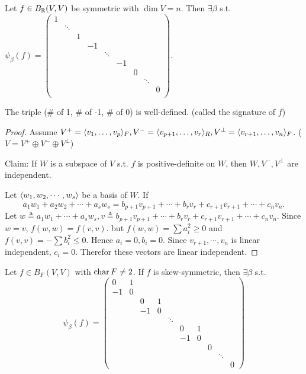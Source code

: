 \begin{theorem}
  Let $f \in B_{\mathbb{R}}(V, V)$ be symmetric with $\dim V = n$. Then $\exists \beta$
  s.t. $\psi_\beta(f) = \begin{pmatrix}
    1 \\
    & \ddots \\
    & & 1 \\
    & & & -1 \\
    & & & & \ddots \\
    & & & & & -1 \\
    & & & & & & 0 \\
    & & & & & & & \ddots \\
    & & & & & & & & 0 \\
  \end{pmatrix}$.

  The triple (\# of 1, \# of -1, \# of 0) is well-defined.
  (called the signature of $f$)
  \begin{proof}


    Assume $V^+ = \langle v_1, \dots, v_p\rangle_F, V^- = \langle v_{p+1}, \dots, v_{r}\rangle_R,
    V^\perp = \langle v_{r+1}, \dots, v_n\rangle_F$. ($V = V^+ \oplus V^- \oplus V^\perp$)

    Claim: If $W$ is a subspace of $V$ s.t. $f$ is positive-definite on $W$,
    then $W, V^-, V^\perp$ are independent.

    Let $\langle w_1, w_2, \cdots, w_s\rangle$ be a basis of $W$. If
    \[ a_1 w_1 + a_2 w_2 + \cdots + a_s w_s = b_{p+1} v_{p+1} + \cdots + b_r v_r + 
      c_{r+1} v_{r+1} + \cdots + c_n v_n. \]
    Let $w \triangleq a_1 w_1 + \cdots + a_s w_s, v \triangleq b_{p+1} v_{p+1} + \cdots + b_r v_r + 
    c_{r+1} v_{r+1} + \cdots + c_n v_n$. Since $w = v$, $f(w, w) = f(v, v)$. 
    but $f(w, w) = \sum a_i^2 \geq 0$ and $f(v, v) = - \sum b_i^2 \leq 0$. Hence $a_i = 0, b_i = 0$.
    Since $v_{r+1}, \cdots, v_n$ is linear independent, $c_i = 0$. Therefor these vectors are linear 
    independent.

  \end{proof}
\end{theorem}

\begin{exercise}
  Let $f \in B_F(V, V)$ with $\operatorname{char} F \ne 2$.
  If $f$ is skew-symmetric, then $\exists \beta$ s.t.
  \[
    \psi_\beta(f) = \begin{pmatrix}
      0 & 1 \\
      -1 & 0 \\
      & & 0 & 1 \\
      & & -1 & 0 \\
      & & & & \ddots \\
      & & & & & 0 & 1 \\
      & & & & & -1 & 0 \\
      & & & & & & & 0 \\
      & & & & & & & & \ddots \\
      & & & & & & & & & 0
    \end{pmatrix}
  \]
\end{exercise}

